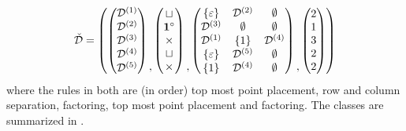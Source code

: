 \[
    \check{\mathcal{D}} = \left(
    \begin{pmatrix}
        \mathcal{D}^{(1)} \\\mathcal{D}^{(2)}\\\mathcal{D}^{(3)}\\\mathcal{D}^{(4)}\\\mathcal{D}^{(5)}    
    \end{pmatrix}
    \begin{matrix}\\ \\ \\ \\,\end{matrix}
    \begin{pmatrix}
        \sqcup\\
        \mathbf{1}^\circ\\
        \times\\
        \sqcup\\
        \times
    \end{pmatrix}
    \begin{matrix}\\ \\ \\ \\,\end{matrix}
    \begin{pmatrix}
        \left\{\varepsilon\right\} & \mathcal{D}^{(2)} & \emptyset\\
        \mathcal{D}^{(3)} & \emptyset & \emptyset\\
        \mathcal{D}^{(1)} & \left\{1\right\} & \mathcal{D}^{(4)}\\
        \left\{\varepsilon\right\} & \mathcal{D}^{(5)} & \emptyset\\
        \left\{1\right\} & \mathcal{D}^{(4)} & \emptyset
    \end{pmatrix}
    \begin{matrix}\\ \\ \\ \\,\end{matrix}
    \begin{pmatrix}
        2\\1\\3\\2\\2
    \end{pmatrix}
    \right)
\]
where the rules in both are (in order) top most point placement, row and column separation, factoring, top most point placement and factoring. The classes are summarized in .

